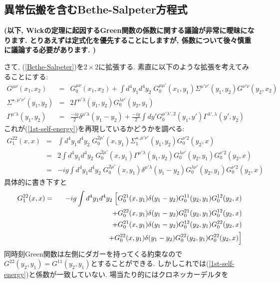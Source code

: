 \documentclass[10.5pt,a4paper]{jreport}
\begin{document}
\subsection{異常伝搬を含むBethe-Salpeter方程式}
\textbf{(以下, Wickの定理に起因するGreen関数の係数に関する議論が非常に曖昧になります. とりあえずは定式化を優先することにしますが, 係数について後々慎重に議論する必要があります. )}

さて, (\ref{Bethe-Salpeter})を$2\times 2$に拡張する. 素直に以下のような拡張を考えてみることにする:
\begin{eqnarray}
  G^{\mu\nu}(x_1, x_2) &=& G_0^{\mu\nu}(x_1, x_2) + \int d^4y_1d^4y_2\;G_0^{\mu\mu'}(x_1, y_1)\Sigma^{\mu'\nu'}(y_1, y_2)G^{\nu'\nu}(y_2, x_2)\\
  \Sigma^{\star, \mu'\nu'}(y_1, y_2) &=& 2\Gamma^{\mu'\lambda}(y_1, y_2)G_0^{\lambda\nu'}(y_2, y_1)\\
\Gamma^{\mu'\lambda}(y_1, y_2) &=& \frac{-ig}{2}\delta^{\mu'\lambda}(y_1 - y_2) + \frac{-ig}{2}\int dy'G_0^{\mu'\lambda', 2}(y_1, y')\Gamma^{\lambda', \lambda}(y', y_2)
\end{eqnarray}
これが(\ref{1st-self-energy})を再現しているかどうかを調べる:
\begin{eqnarray}
  G^{22}_1(x, x) &=& \int d^4y_1d^4y_2\;G_0^{2\mu'}(x, y_1)\Sigma_1^{\star, \mu'\nu'}(y_1, y_2)G_0^{\nu'2}(y_2, x)\\
  &=&  2\int d^4y_1d^4y_2\;G_0^{2\mu'}(x, y_1)\Gamma^{\mu'\lambda}(y_1, y_2)G_0^{\lambda\nu'}(y_2, y_1)G_0^{\nu'2}(y_2, x)\\
  &=& -ig\int d^4y_1d^4y_2\;G_0^{2\mu'}(x, y_1)\delta^{\mu'\lambda}(y_1 - y_2)G_0^{\lambda\nu'}(y_2, y_1)G_0^{\nu'2}(y_2, x)
\end{eqnarray}
具体的に書き下すと
\begin{eqnarray}
  G^{22}_1(x, x) &=& -ig\int d^4y_1d^4y_2\;\Bigl[G_0^{21}(x, y_1)\delta(y_1 - y_2)G_0^{11}(y_2, y_1)G_0^{12}(y_2, x)\\
    && \hspace{2.5cm} + G_0^{22}(x, y_1)\delta(y_1 - y_2)G_0^{21}(y_2, y_1)G_0^{12}(y_2, x)\\
    && \hspace{2.5cm} + G_0^{21}(x, y_1)\delta(y_1 - y_2)G_0^{12}(y_2, y_1)G_0^{22}(y_2, x)\\
    && \hspace{2.5cm} + G_0^{22}(x, y_1)\delta(y_1 - y_2)G_0^{22}(y_2, y_1)G_0^{22}(y_2, x)\Bigr]
\end{eqnarray}
同時刻Green関数は左側にダガーを持ってくる約束なので$G^{22}(y_2, y_1) = G^{11}(y_2, y_1)$とすることができる. しかしこれでは(\ref{1st-self-energy})と係数が一致していない. 場当たり的にはクロネッカーデルタを
\end{document}
